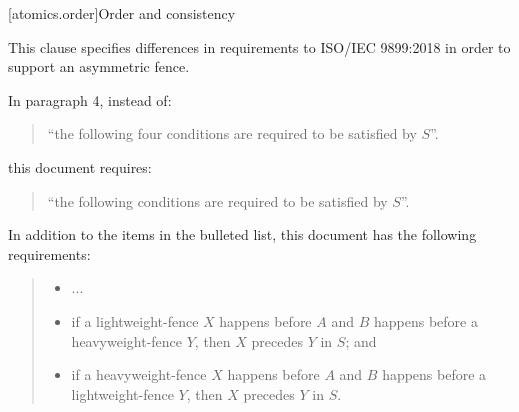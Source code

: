 

\setcounter{chapter}{33}
\setcounter{section}{5}
\setcounter{subsection}{3}
[atomics.order]{Order and consistency}

This clause specifies differences in requirements to ISO/IEC 9899:2018
in order to support an asymmetric fence.

In  paragraph 4, instead of:

\begin{quote}
``the following four conditions are required to be satisfied by $S$''.
\end{quote}

this document requires:

\begin{quote}
``the following conditions are required to be satisfied by $S$''.
\end{quote}

In addition to the items in the bulleted list, this document has the
following requirements:
\begin{quote}
\begin{itemize}
\item
  ...
\item
if a  lightweight-fence $X$ happens before $A$ and $B$ happens
before a  heavyweight-fence $Y$, then $X$ precedes $Y$ in $S$; and
\item  if a  heavyweight-fence $X$ happens before $A$ and $B$ happens
before a  lightweight-fence $Y$, then $X$ precedes $Y$ in $S$.
\end{itemize}
\end{quote}
